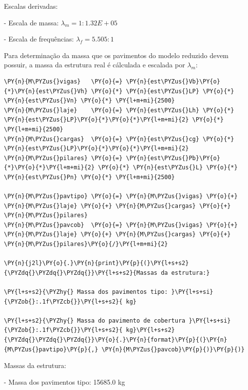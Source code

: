     
    Escalas derivadas:

- Escala de massa: $\lambda_m = 1:1.32E+05$

- Escala de frequências: $\lambda_f = 5.505:1$

    
    Para determinação da massa que os pavimentos do modelo reduzido devem
possuir, a massa da estrutura real é cálculada e escalada por
\(\lambda_m\):

    \begin{tcolorbox}[breakable, size=fbox, boxrule=1pt, pad at break*=1mm,colback=cellbackground, colframe=cellborder]
\begin{Verbatim}[commandchars=\\\{\}]
\PY{n}{M\PYZus{}vigas}   \PY{o}{=} \PY{n}{est\PYZus{}Vb}\PY{o}{*}\PY{n}{est\PYZus{}Vh} \PY{o}{*} \PY{n}{est\PYZus{}LP} \PY{o}{*} \PY{n}{est\PYZus{}Vn} \PY{o}{*} \PY{l+m+mi}{2500} 
\PY{n}{M\PYZus{}laje}    \PY{o}{=} \PY{n}{est\PYZus{}Lh} \PY{o}{*} \PY{n}{est\PYZus{}LP}\PY{o}{*}\PY{o}{*}\PY{l+m+mi}{2} \PY{o}{*} \PY{l+m+mi}{2500}         
\PY{n}{M\PYZus{}cargas}  \PY{o}{=} \PY{n}{est\PYZus{}cg} \PY{o}{*} \PY{n}{est\PYZus{}LP}\PY{o}{*}\PY{o}{*}\PY{l+m+mi}{2}                
\PY{n}{M\PYZus{}pilares} \PY{o}{=} \PY{n}{est\PYZus{}Pb}\PY{o}{*}\PY{o}{*}\PY{l+m+mi}{2} \PY{o}{*} \PY{n}{est\PYZus{}L} \PY{o}{*} \PY{n}{est\PYZus{}Pn} \PY{o}{*} \PY{l+m+mi}{2500}

\PY{n}{M\PYZus{}pavtipo} \PY{o}{=} \PY{n}{M\PYZus{}vigas} \PY{o}{+} \PY{n}{M\PYZus{}laje} \PY{o}{+} \PY{n}{M\PYZus{}cargas} \PY{o}{+} \PY{n}{M\PYZus{}pilares}
\PY{n}{M\PYZus{}pavcob}  \PY{o}{=} \PY{n}{M\PYZus{}vigas} \PY{o}{+} \PY{n}{M\PYZus{}laje} \PY{o}{+} \PY{n}{M\PYZus{}cargas} \PY{o}{+} \PY{n}{M\PYZus{}pilares}\PY{o}{/}\PY{l+m+mi}{2}

\PY{n}{j2l}\PY{o}{.}\PY{n}{print}\PY{p}{(}\PY{l+s+s2}{\PYZdq{}\PYZdq{}\PYZdq{}}\PY{l+s+s2}{Massas da estrutura:}

\PY{l+s+s2}{\PYZhy{} Massa dos pavimentos tipo: }\PY{l+s+si}{\PYZob{}:.1f\PYZcb{}}\PY{l+s+s2}{ kg}

\PY{l+s+s2}{\PYZhy{} Massa do pavimento de cobertura }\PY{l+s+si}{\PYZob{}:.1f\PYZcb{}}\PY{l+s+s2}{ kg}\PY{l+s+s2}{\PYZdq{}\PYZdq{}\PYZdq{}}\PY{o}{.}\PY{n}{format}\PY{p}{(}\PY{n}{M\PYZus{}pavtipo}\PY{p}{,} \PY{n}{M\PYZus{}pavcob}\PY{p}{)}\PY{p}{)}
\end{Verbatim}
\end{tcolorbox}

    Massas da estrutura:

- Massa dos pavimentos tipo: 15685.0 kg

